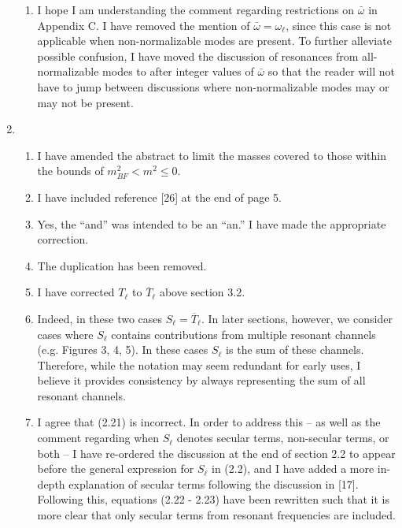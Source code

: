 \documentclass[11pt,letterpaper]{article}
\begin{document}
\begin{enumerate}
\begin{enumerate}
        \item I hope I am understanding the comment regarding restrictions on $\bar\omega$ in Appendix C. I have removed the mention of $\bar\omega = \omega_\ell$, since this case is not applicable when non-normalizable modes are present. To further alleviate possible confusion, I have moved the discussion of resonances from all-normalizable modes to after integer values of $\bar\omega$ so that the reader will not have to jump between discussions where non-normalizable modes may or may not be present.  
    \end{enumerate}
    \item %
    \begin{enumerate}
        \item I have amended the abstract to limit the masses covered to those within the bounds of $m^2_{BF} < m^2 \leq 0$.
        \item I have included reference [26] at the end of page 5. 
        \item Yes, the ``and'' was intended to be an ``an.'' I have made the appropriate correction.
        \item The duplication has been removed.
        \item I have corrected $T_\ell$ to $\overline{T}_\ell$ above section 3.2.
        \item Indeed, in these two cases $S_\ell = \overline{T}_\ell$.  In later sections, however, we consider cases where $S_\ell$ contains contributions from multiple resonant channels (e.g. Figures 3, 4, 5). In these cases $S_\ell$ is the sum of these channels. Therefore, while the notation may seem redundant for early uses, I believe it provides consistency by always representing the sum of all resonant channels. 
        \item I agree that (2.21) is incorrect. In order to address this -- as well as the comment regarding when $S_\ell$ denotes secular terms, non-secular terms, or both -- I have re-ordered the discussion at the end of section 2.2 to appear before the general expression for $S_\ell$ in (2.2), and I have added a more in-depth explanation of secular terms following the discussion in [17]. Following this, equations (2.22 - 2.23) have been rewritten such that it is more clear that only secular terms from resonant frequencies are included.
    \end{enumerate} 
\end{enumerate}
\end{document}
